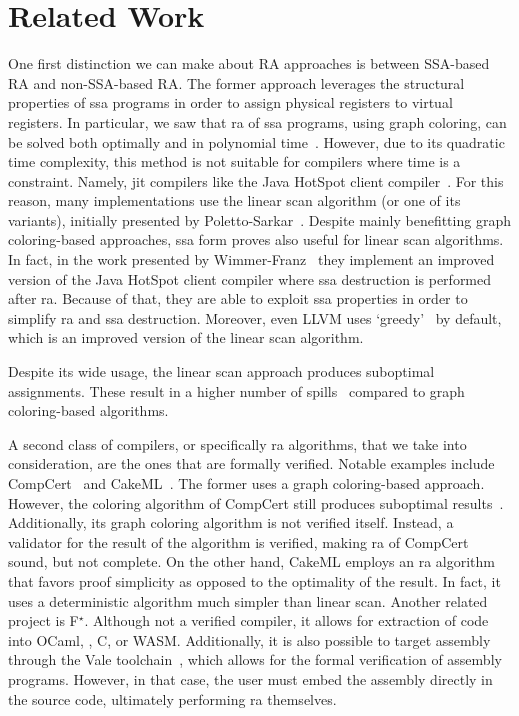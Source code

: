 
\chapter{Related Work}
\label{cha:relwork}

One first distinction we can make about RA approaches is between SSA-based RA and non-SSA-based RA. The former approach leverages the structural properties of \gls{ssa} programs in order to assign physical registers to virtual registers. In particular, we saw that \gls{ra} of \gls{ssa} programs, using graph coloring, can be solved both optimally and in polynomial time~\cite{HACK2006150}. However, due to its quadratic time complexity, this method is not suitable for compilers where time is a constraint. Namely, \gls{jit} compilers like the Java HotSpot\texttrademark{} client compiler~\cite{10.1145/1369396.1370017}. For this reason, many implementations use the linear scan algorithm (or one of its variants), initially presented by Poletto-Sarkar~\cite{10.1145/330249.330250}. Despite mainly benefitting graph coloring-based approaches, \gls{ssa} form proves also useful for linear scan algorithms. In fact, in the work presented by Wimmer-Franz~\cite{10.1145/1772954.1772979} they implement an improved version of the Java HotSpot\texttrademark{} client compiler where \gls{ssa} destruction is performed after \gls{ra}. Because of that, they are able to exploit \gls{ssa} properties in order to simplify \gls{ra} and \gls{ssa} destruction. Moreover, even LLVM uses `greedy'~\cite{Olesen2011Greedy} by default, which is an improved version of the linear scan algorithm.

Despite its wide usage, the linear scan approach produces suboptimal assignments. These result in a higher number of spills~\cite{10.1007/11688839_12} compared to graph coloring-based algorithms.

A second class of compilers, or specifically \gls{ra} algorithms, that we take into consideration, are the ones that are formally verified. Notable examples include CompCert~\cite{2006-Leroy-compcert} and CakeML~\cite{10.1145/2578855.2535841}. The former uses a graph coloring-based approach. However, the coloring algorithm of CompCert still produces suboptimal results~\cite{Rideau-Leroy-regalloc}. Additionally, its graph coloring algorithm is not verified itself. Instead, a validator for the result of the algorithm is verified, making \gls{ra} of CompCert sound, but not complete. On the other hand, CakeML employs an \gls{ra} algorithm that favors proof simplicity as opposed to the optimality of the result. In fact, it uses a deterministic algorithm much simpler than linear scan. Another related project is F$^\star$\cite{DBLP:journals/corr/BhargavanDFHPRR17}. Although not a verified compiler, it allows for extraction of code into OCaml, \FSharp, C, or WASM. Additionally, it is also possible to target assembly through the Vale toolchain~\cite{203642}, which allows for the formal verification of assembly programs. However, in that case, the user must embed the assembly directly in the source code, ultimately performing \gls{ra} themselves.


